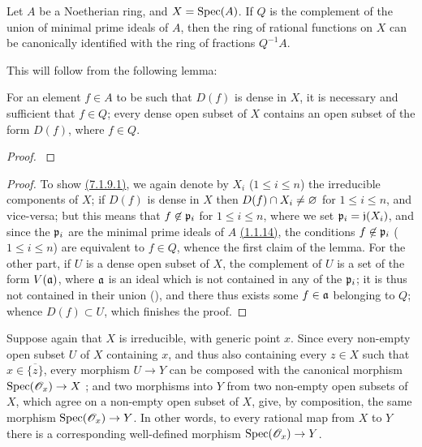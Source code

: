 \begin{cor}[7.1.9]
\label{1.7.1.9}
Let $A$ be a Noetherian ring, and $X={\mathop{\mathrm{Spec}}\nolimits}(A)$.
If $Q$ is the complement of the union of minimal prime ideals of $A$, then the ring of rational functions on $X$ can be canonically identified with the ring of fractions $Q^{-1}A$.
\end{cor}

This will follow from the following lemma:

\begin{lem}[7.1.9.1]
\label{1.7.1.9.1}
For an element $f\in A$ to be such that $D(f)$ is dense in $X$, it is necessary and sufficient that $f\in Q$; every dense open subset of $X$ contains an open subset of the form $D(f)$, where $f\in Q$.
\end{lem}

\begin{proof}
\label{proof-1.7.1.9}
\end{proof}

\begin{proof}
\label{proof-1.7.1.9.1}
To show \hyperref[1.7.1.9.1]{(7.1.9.1)}, we again denote by $X_i$ ($1\leqslant i\leqslant n$) the irreducible components of $X$; if $D(f)$ is dense in $X$ then $D(f)\cap X_i\neq\varnothing$ for $1\leqslant i\leqslant n$, and vice-versa; but this means that $f\not\in\mathfrak{p}_i$ for $1\leqslant i\leqslant n$, where we set $\mathfrak{p}_i=\mathfrak{j}(X_i)$, and since the $\mathfrak{p}_i$ are the minimal prime ideals of $A$ \hyperref[1.1.1.14]{(1.1.14)}, the conditions $f\not\in\mathfrak{p}_i$ ($1\leqslant i\leqslant n$) are equivalent to $f\in Q$, whence the first claim of the lemma.
For the other part, if $U$ is a dense open subset of $X$, the complement of $U$ is a set of the form $V(\mathfrak{a})$, where $\mathfrak{a}$ is an ideal which is not contained in any of the $\mathfrak{p}_i$; it is thus not contained in their union (\cite[p.~13]{I-10}), and there thus exists some $f\in\mathfrak{a}$ belonging to $Q$; whence $D(f)\subset U$, which finishes the proof.
\end{proof}

\begin{env}[7.1.10]
\label{1.7.1.10}
Suppose again that $X$ is irreducible, with generic point $x$.
Since every non-empty open subset $U$ of $X$ containing $x$, and thus also containing every $z\in X$ such that $x\in\overline{\{z\}}$, every morphism $U\to Y$ can be composed with the canonical morphism ${\mathop{\mathrm{Spec}}\nolimits}(\mathscr{O}_x)\to X$ ; and two morphisms into $Y$ from two non-empty open subsets of $X$, which agree on a non-empty open subset of $X$, give, by composition, the same morphism ${\mathop{\mathrm{Spec}}\nolimits}(\mathscr{O}_x)\to Y$.
In other words, to every rational map from $X$ to $Y$ there is a corresponding well-defined morphism ${\mathop{\mathrm{Spec}}\nolimits}(\mathscr{O}_x)\to Y$.
\end{env}

